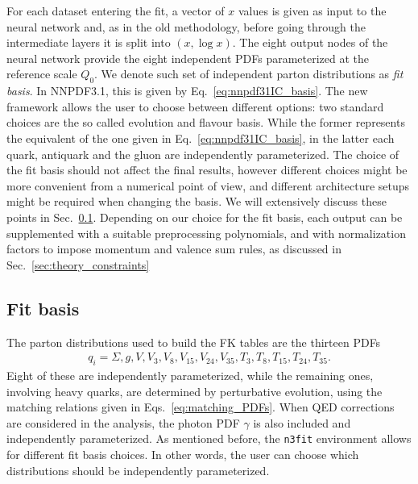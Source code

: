 %
For each dataset entering the fit, a vector of $x$ values is given as input to the neural network and,
as in the old methodology, before going through the intermediate layers it is split into $\left(x,\log x\right)$.
The eight output nodes of the neural network provide the eight independent PDFs parameterized at 
the reference scale $Q_0$. We denote such set of independent parton distributions as \textit{fit basis}.
In NNPDF3.1, this is given by Eq.~\eqref{eq:nnpdf31IC_basis}. The new framework allows the user to choose between 
different options: two standard choices are the so called evolution and flavour basis.
While the former represents the equivalent of the one given in Eq.~\eqref{eq:nnpdf31IC_basis}, in
the latter each quark, antiquark and the gluon are independently parameterized. 
The choice of the fit basis should not affect the final results, however different choices might be more
convenient from a numerical point of view, and different architecture setups might be required
when changing the basis. We will extensively discuss these points in Sec.~\ref{sec:fitbasis}.
Depending on our choice for the fit basis, each output can be supplemented with a suitable preprocessing
polynomials, and with normalization factors to impose momentum and valence sum rules,
as discussed in Sec.~\ref{sec:theory_constraints}

\subsection{Fit basis}
\label{sec:fitbasis}
The parton distributions used to build the FK tables are the thirteen PDFs
\begin{align}
	\label{eq::fkdistributions}
	q_i = \Sigma, g, V, V_3, V_8, V_{15}, V_{24}, V_{35}, T_3, T_8, T_{15}, T_{24}, T_{35}.
\end{align}
Eight of these are independently parameterized, while the remaining ones, involving heavy quarks,
are determined by perturbative evolution, using the matching relations given in Eqs.~\eqref{eq:matching_PDFs}.
When QED corrections are considered in the analysis,
the photon PDF $\gamma$ is also included and independently parameterized.   
As mentioned before, the {\tt n3fit} environment allows for different fit basis choices. In other 
words, the user can choose which distributions should be independently parameterized. 

